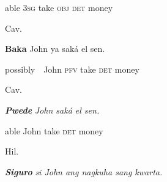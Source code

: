 \begin{stylelsIMT}
able 3\textsc{sg} take \textsc{obj} \textsc{det} money\ \ 
\end{stylelsIMT}

\begin{listWWNumiileveli}
\item 
\begin{listWWNumiilevelii}
\item 
\begin{stylelsLanginfo}
Cav.
\end{stylelsLanginfo}
\end{listWWNumiilevelii}
\end{listWWNumiileveli}
\begin{stylelsSourceline}
\textbf{Baka} John ya saká el sen.
\end{stylelsSourceline}

\begin{stylelsIMT}
possibly\ \ John \textsc{pfv} take \textsc{det} money
\end{stylelsIMT}

\begin{listWWNumiileveli}
\item 
\begin{listWWNumiilevelii}
\item 
\begin{stylelsLanginfo}
Cav.
\end{stylelsLanginfo}
\end{listWWNumiilevelii}
\end{listWWNumiileveli}
\begin{stylelsIMT}
\textbf{\textit{Pwede}}\textit{ John saká el sen.}
\end{stylelsIMT}

\begin{stylelsIMT}
able John take \textsc{det} money
\end{stylelsIMT}

\begin{listWWNumiileveli}
\item 
\begin{listWWNumiilevelii}
\item 
\begin{stylelsLanginfo}
Hil.
\end{stylelsLanginfo}
\end{listWWNumiilevelii}
\end{listWWNumiileveli}
\begin{stylelsIMT}
\textbf{\textit{Siguro}}\textit{ si John ang nagkuha sang kwarta.}
\end{stylelsIMT}


